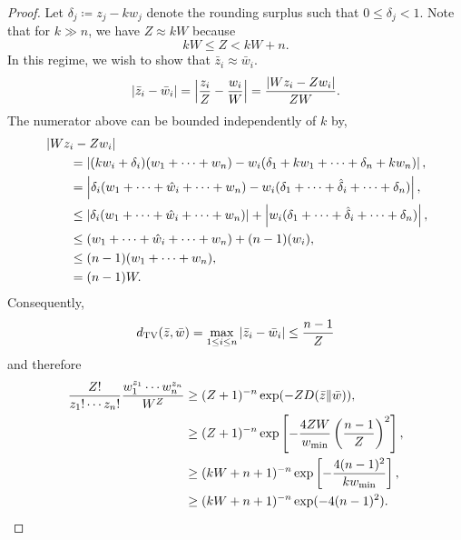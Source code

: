 \documentclass[notitlepage, 10pt]{article}
\begin{document}
\begin{proof}
    Let $\delta_{j} \coloneqq z_j - k w_j$ denote the rounding surplus such that $0\leq \delta_j < 1$.
    Note that for $k \gg n$, we have $Z \approx kW$ because
    \begin{equation}
        kW \leq Z < kW + n.
    \end{equation}
    In this regime, we wish to show that $\bar z_i \approx \bar w_i$.
    \begin{align}
        \left|\bar z_i - \bar w_i\right|
        =\left|\frac{z_i}{Z} - \frac{w_i}{W}\right| 
        = \frac{\left|Wz_i - Zw_i\right|}{ZW}.
    \end{align}
    The numerator above can be bounded independently of $k$ by,
    \begin{align}
        &\left|Wz_i - Zw_i\right|\\
        &\qquad= \left|(kw_i + \delta_i)(w_1+\cdots+w_n) - w_i(\delta_1 + k w_1+ \cdots + \delta_n + k w_n)\right|, \\
        &\qquad= \left|\delta_i(w_1+\cdots+\hat w_i+\cdots+w_n) - w_i(\delta_1 + \cdots+\hat \delta_i+\cdots + \delta_n)\right|, \\
        &\qquad\leq \left|\delta_i(w_1+\cdots+\hat w_i+\cdots+w_n)\right| + \left|w_i(\delta_1 + \cdots+\hat \delta_i+\cdots + \delta_n)\right|, \\
        &\qquad\leq (w_1+\cdots+\hat w_i+\cdots+w_n) + (n-1)(w_i), \\
        &\qquad\leq (n-1)(w_1+\cdots+w_n), \\
        &\qquad= (n-1)W.
    \end{align}
    Consequently,
    \begin{equation}
        d_{\mathrm{TV}}(\bar z, \bar w) = \max_{1 \leq i \leq n} \left|\bar z_i - \bar w_i\right| \leq \frac{n-1}{Z}
    \end{equation}
    and therefore
    \begin{align}
        \frac{Z!}{z_1! \cdots z_n!}\frac{w_1^{z_{1}}\cdots w_{n}^{z_{n}}}{W^{Z}} 
        &\geq (Z+1)^{-n} \exp(-ZD\!\left(\bar z\middle\|\bar w\right)), \\
        &\geq (Z+1)^{-n} \exp\left[-\frac{4ZW}{w_{\min}} \left(\frac{n-1}{Z}\right)^2\right], \\
        &\geq (kW+n+1)^{-n} \exp\left[-\frac{4(n-1)^2}{k w_{\min}}\right], \\
        &\geq (kW+n+1)^{-n} \exp(-4(n-1)^2).
    \end{align}
\end{proof}
\end{document}
